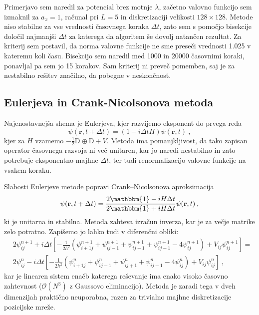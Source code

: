 \documentclass[11pt]{report}
\newcommand{\D}{\text{D}}
\newcommand{\rr}{\mathbf{r}}
\newcommand{\I}{\mathbbm{1}}
\begin{document}
\newpage
\noindent
Primerjavo sem naredil za potencial brez motnje $\lambda$, začetno valovno funkcijo sem izmaknil za $a_x=1$,
računal pri $L=5$ in diskretizaciji velikosti $128 \times 128$. Metode niso stabilne za vse vrednosti
časovnega koraka $\Delta t$, zato sem s pomočjo bisekcije določil najmanjši $\Delta t$ za
katerega da algoritem še dovolj natančen rezultat. Za kriterij sem postavil, da norma valovne funkcije
ne sme preseči vrednosti 1.025 v kateremu koli času. Bisekcijo sem naredil med 1000 in 20000 časovnimi koraki,
ponavljal pa sem jo 15 korakov. Sam kriterij ni preveč pomemben, saj je za nestabilno rešitev značilno, da
pobegne v neskončnost.

\subsection{Eulerjeva in Crank-Nicolsonova metoda}
Najenostavnejša shema je Eulerjeva, kjer razvijemo eksponent do prvega reda
\begin{equation}
	\psi(\rr, t + \Delta t) = \left ( 1 - i\Delta t H \right ) \psi(\rr, t) \>,
\end{equation}
kjer za $H$ vzamemo $-\frac{1}{2} \D \oplus \D + V$.
Metoda ima pomanjkljivost, da tako zapisan operator časovnega razvoja ni več unitaren, kar jo naredi nestabilno
in zato potrebuje eksponentno majhne $\Delta t$, ter tudi renormalizacijo valovne funkcije na vsakem koraku.

Slabosti Eulerjeve metode popravi Crank–Nicolsonova aproksimacija
\begin{equation}
	\psi(\rr, t + \Delta t) = \frac{2 \I - iH\Delta t}{2 \I + iH\Delta t} \psi(\rr, t) \>,
\end{equation}
ki je unitarna in stabilna. Metoda zahteva izračun inverza, kar je za večje matrike zelo potratno.
Zapišemo jo lahko tudi v diferenčni obliki:
\begin{equation}
	\label{eq: cn}
	\begin{aligned}
		 & 2 \psi_{ij}^{n+1} + i \Delta t \left [ -\frac{1}{2h^2} \left ( \psi_{i+1j}^{n+1} + \psi_{ij-1}^{n+1} +
			\psi_{ij+1}^{n+1} + \psi_{ij-1}^{n+1} - 4\psi_{ij}^{n+1} \right ) + V_{ij} \psi_{ij}^{n+1}\right ] =      \\
		 & 2 \psi_{ij}^{n} - i \Delta t \left [ -\frac{1}{2h^2} \left ( \psi_{i+1j}^{n} + \psi_{ij-1}^{n} +
			\psi_{ij+1}^{n} + \psi_{ij-1}^{n} - 4\psi_{ij}^{n} \right ) + V_{ij} \psi_{ij}^{n}\right ] \>,
	\end{aligned}
\end{equation}
kar je linearen sistem enačb katerega reševanje ima enako visoko časovno zahtevnost ($\mathcal{O}(N^3)$ z Gaussovo eliminacijo).
Metoda je zaradi tega v dveh dimenzijah praktično neuporabna, razen za trivialno majhne diskretizacije pozicijske
mreže.
\end{document}
